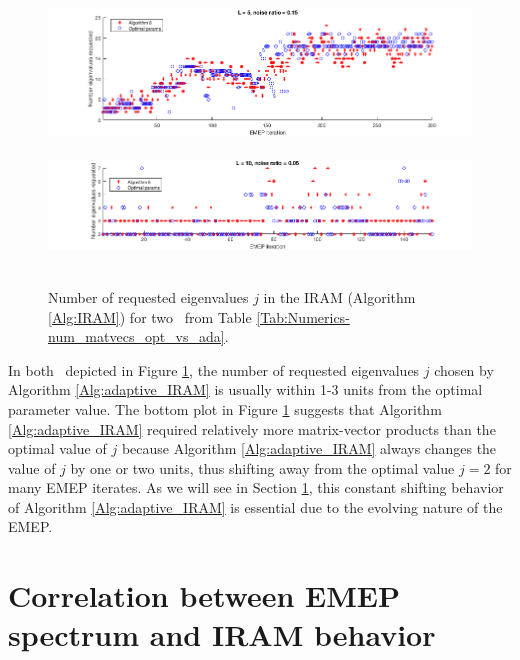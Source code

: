 \begin{figure}[H]
\centering
\hbox{\hspace{-1.8cm} \includegraphics[scale=0.6]{Numerics-num_eigs_ada_vs_opt_1} }\vspace{0.6cm}
\hbox{\hspace{-1.8cm} \includegraphics[scale=0.6]{Numerics-num_eigs_ada_vs_opt_2} }
\vspace{0.2cm}
	\caption{
	Number of requested eigenvalues $j$ in the IRAM (Algorithm \ref{Alg:IRAM}) for two \emeps \ from Table \ref{Tab:Numerics-num_matvecs_opt_vs_ada}.
	}
\label{Fig:Numerics-num_eigs_ada_vs_opt}
\end{figure}


In both \emeps \ depicted in Figure \ref{Fig:Numerics-num_eigs_ada_vs_opt}, the number of requested eigenvalues $j$ chosen by Algorithm \ref{Alg:adaptive_IRAM} is usually within 1-3 units from the optimal parameter value.
The bottom plot in Figure \ref{Fig:Numerics-num_eigs_ada_vs_opt} suggests that Algorithm \ref{Alg:adaptive_IRAM} required relatively more matrix-vector products than the optimal value of $j$ because Algorithm \ref{Alg:adaptive_IRAM} always changes the value of $j$ by one or two units, thus shifting away from the optimal value $j=2$ for many EMEP iterates.
As we will see in Section \ref{Subsec:Numerics-correl_btwn_EMEP_and_IRAM}, this constant shifting behavior of Algorithm \ref{Alg:adaptive_IRAM} is essential due to the evolving nature of the EMEP.





\section{Correlation between EMEP spectrum and IRAM behavior}
\label{Subsec:Numerics-correl_btwn_EMEP_and_IRAM}






